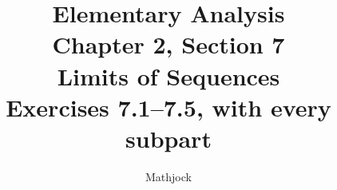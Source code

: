 
\title{\textbf{Elementary Analysis}\\[0.3em]
Chapter 2, Section 7\\[0.3em]
\large Limits of Sequences\\
Exercises 7.1--7.5, with every subpart}
\author{Mathjock}
\date{}

\maketitle
\bookinfo
\tableofcontents
\clearpage
\setcounter{section}{6}


